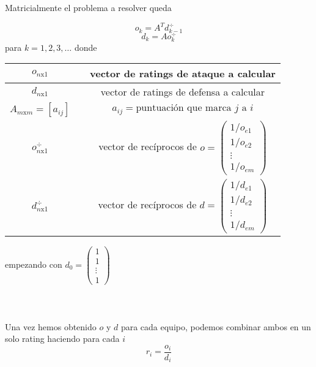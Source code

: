 Matricialmente el problema a resolver queda

\begin{equation}
o_{k} = A^{T} d_{k-1}^{\div} \label{ataq}
\end{equation}
\begin{equation}
d_{k} = A o_{k}^{\div} \label{defen}
\end{equation}
para $k=1,2,3,\dots$ donde
\begin{center}
	\begin{tabular}{ccc}
		\hline  $o_{n\text{x}1}$ & & vector de ratings de ataque a calcular \\
		\hline  $d_{n\text{x}1}$ & & vector de ratings de defensa a calcular \\
		\hline $A_{m\text{x}m}=[a_{ij}]$ & & $a_{ij}=\text{puntuación que marca } j \text{ a } i$  \\ 
		\hline  $o_{n\text{x}1}^{\div}$ & & vector de recíprocos de $o = 		\left(\begin{array}{c}
		1/o_{e1}\\
		1/o_{e2}\\
		\vdots \\
		1/o_{em}
		\end{array} \right)$ \\
		\hline  $d_{n\text{x}1}^{\div}$ & & vector de recíprocos de $d = 		\left(\begin{array}{c}
		1/d_{e1}\\
		1/d_{e2}\\
		\vdots \\
		1/d_{em}
		\end{array} \right)$ \\
		\hline 
	\end{tabular}
\end{center} 

empezando con
$d_{0}=
\left(\begin{array}{c}
1\\
1\\
\vdots \\
1
\end{array} \right) $
\ \\
\ \\
\ \\
\ \\
Una vez hemos obtenido $o$ y $d$ para cada equipo, podemos combinar ambos en un solo rating haciendo para cada $i$
\begin{equation}
r_{i}= \dfrac{o_{i}}{d_{i}} \label{ODr}
\end{equation}
\ \\

